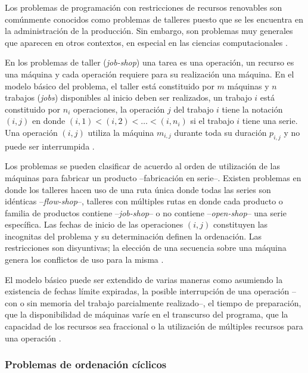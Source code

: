 \documentclass[spanish,draft,12pt,headsepline,footsepline,paper=letter]{scrreprt}
\begin{document}
Los problemas de programación con restricciones de recursos renovables son comúnmente conocidos como problemas de talleres puesto que se les encuentra en la administración de la producción. Sin embargo, son problemas muy generales que aparecen en otros contextos, en especial en las ciencias computacionales \citep[p.~101]{gotha93les-problemes-dordonnancement}.

En los problemas de taller (\textit{job-shop}) una tarea es una operación, un recurso es una máquina y cada operación requiere para su realización una máquina. En el modelo básico del problema, el taller está constituido por $m$ máquinas y $n$ trabajos (\textit{jobs}) disponibles al inicio deben ser realizados, un trabajo $i$ está constituido por $n_i$ operaciones, la operación $j$ del trabajo $i$ tiene la notación $(i,j)$ en donde $(i,1)<(i,2)<\dots<(i,n_i)$ si el trabajo $i$ tiene una serie. Una operación $(i,j)$ utiliza la máquina $m_{i,j}$ durante toda su duración $p_{i,j}$ y no puede ser interrumpida \citep[p.~102]{gotha93les-problemes-dordonnancement}.

Los problemas se pueden clasificar de acuerdo al orden de utilización de las máquinas para fabricar un producto –fabricación en serie–. Existen problemas en donde los talleres hacen uso de una ruta única donde todas las series son idénticas –\textit{flow-shop}–, talleres con múltiples rutas en donde cada producto o familia de productos contiene –\textit{job-shop}– o no contiene –\textit{open-shop}– una serie específica. Las fechas de inicio de las operaciones $(i,j)$ constituyen las incognitas del problema y su determinación definen la ordenación. Las restricciones son disyuntivas; la elección de una secuencia sobre una máquina genera los conflictos de uso para la misma \citep[p.~102]{gotha93les-problemes-dordonnancement}.

El modelo básico puede ser extendido de varias maneras como asumiendo la existencia de fechas límite expiradas, la posible interrupción de una operación –con o sin memoria del trabajo parcialmente realizado–, el tiempo de preparación, que la disponibilidad de máquinas varíe en el transcurso del programa, que la capacidad de los recursos sea fraccional o la utilización de múltiples recursos para una operación \citep[p.~102]{gotha93les-problemes-dordonnancement}.


\subsubsection{Problemas de ordenación cíclicos}
\label{problemas_ordenacion_ciclicos}
\end{document}
